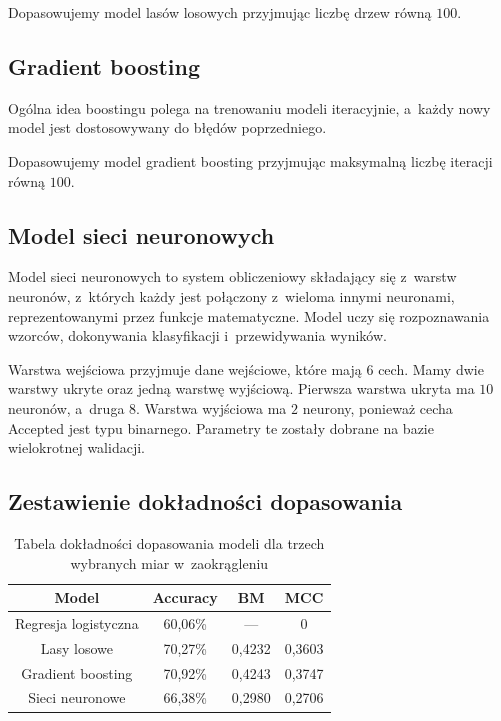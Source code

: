 \documentclass[12pt]{article}
\begin{document}
	\vspace{0.25cm}

	Dopasowujemy model lasów losowych przyjmując liczbę drzew równą $100$.

	\subsection{Gradient boosting}\label{subsec:gradient-boosting}
	Ogólna idea boostingu polega na trenowaniu modeli iteracyjnie, a~każdy nowy model jest dostosowywany do błędów poprzedniego.

	\vspace{0.25cm}

	Dopasowujemy model gradient boosting przyjmując maksymalną liczbę iteracji równą $100$.

	\subsection{Model sieci neuronowych}\label{subsec:model-sieci-neuronowych}
	Model sieci neuronowych to system obliczeniowy składający się z~warstw neuronów, z~których każdy jest połączony z~wieloma innymi neuronami, reprezentowanymi przez funkcje matematyczne.
	Model uczy się rozpoznawania wzorców, dokonywania klasyfikacji i~przewidywania wyników.

	\vspace{0.25cm}

	Warstwa wejściowa przyjmuje dane wejściowe, które mają $6$ cech.
	Mamy dwie warstwy ukryte oraz jedną warstwę wyjściową.
	Pierwsza warstwa ukryta ma $10$ neuronów, a~druga $8$.
	Warstwa wyjściowa ma $2$ neurony, ponieważ cecha Accepted jest typu binarnego.
	Parametry te zostały dobrane na bazie wielokrotnej walidacji.

	\subsection{Zestawienie dokładności dopasowania}\label{subsec:zestawienie-dopasowania-modeli}

	\begin{table}[H]
		\centering
		\begin{tabular}{c|ccc}
			\hline\hline
			Model             	 & Accuracy & BM     & MCC    \\\hline
			Regresja logistyczna & 60,06\%  & ---    & 0      \\
			Lasy losowe          & 70,27\%  & 0,4232 & 0,3603 \\
			Gradient boosting    & 70,92\%  & 0,4243 & 0,3747 \\
			Sieci neuronowe      & 66,38\%  & 0,2980 & 0,2706 \\\hline
		\end{tabular}
		\caption{Tabela dokładności dopasowania modeli dla trzech wybranych miar w~zaokrągleniu}
		\label{tab:dokladnosc}
	\end{table}
\end{document}
